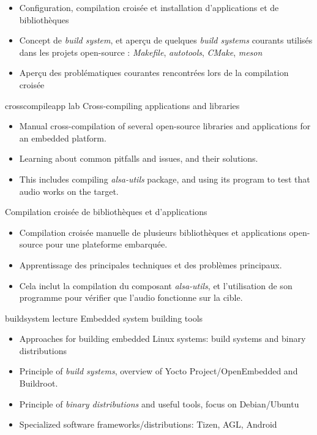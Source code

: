 {
  \begin{itemize}
  \item Configuration, compilation croisée et installation
    d'applications et de bibliothèques
  \item Concept de {\em build system}, et aperçu de quelques {\em
      build systems} courants utilisés dans les projets open-source :
    {\em Makefile}, {\em autotools}, {\em CMake}, {\em meson}
  \item Aperçu des problématiques courantes rencontrées lors de la
    compilation croisée
  \end{itemize}
}
{crosscompileapp}
{lab}
{Cross-compiling applications and libraries}
{
  \begin{itemize}
  \item Manual cross-compilation of several open-source libraries and
    applications for an embedded platform.
  \item Learning about common pitfalls and issues, and their
    solutions.
  \item This includes compiling {\em alsa-utils} package,
    and using its  program to test that
    audio works on the target.
  \end{itemize}
}
{Compilation croisée de bibliothèques et d'applications}
{
  \begin{itemize}
  \item Compilation croisée manuelle de plusieurs bibliothèques et
    applications open-source pour une plateforme embarquée.
  \item Apprentissage des principales techniques et des problèmes
    principaux.
  \item Cela inclut la compilation du composant {\em alsa-utils},
     et l'utilisation de son programme  pour
     vérifier que l'audio fonctionne sur la cible.
  \end{itemize}
}
{buildsystem}
{lecture}
{Embedded system building tools}
{
  \begin{itemize}
  \item Approaches for building embedded Linux systems: build systems
    and binary distributions
  \item Principle of {\em build systems}, overview of Yocto
    Project/OpenEmbedded and Buildroot.
  \item Principle of {\em binary distributions} and useful tools,
    focus on Debian/Ubuntu
  \item Specialized software frameworks/distributions: Tizen, AGL,
    Android
  \end{itemize}
}
